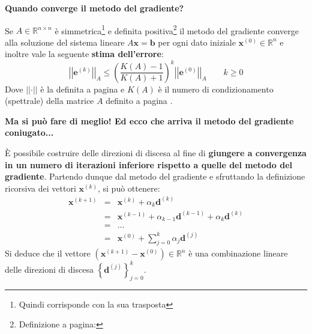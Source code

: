 \newpage

\begin{flushleft}
    \textcolor{Green3}{ \textbf{Quando converge il metodo del gradiente?}}
\end{flushleft}
Se $A \in \mathbb{R}^{n \times n}$ è simmetrica\footnote{Quindi corrisponde con la sua trasposta} e definita positiva\footnote{Definizione a pagina: \pageref{matrice definita positiva}} il metodo del gradiente converge alla soluzione del sistema lineare $A\mathbf{x} = \mathbf{b}$ per ogni dato iniziale $\mathbf{x}^{\left(0\right)} \in \mathbb{R}^{n}$ e inoltre vale la seguente \textbf{stima dell'errore}:
\begin{equation}
    \left|\left| \mathbf{e}^{\left(k\right)} \right|\right|_{A} \le \left(\dfrac{K\left(A\right)-1}{K\left(A\right)+1}\right)^{k} \left|\left| \mathbf{e}^{\left(0\right)} \right|\right|_{A} \hspace{2em} k \ge 0
\end{equation}
Dove $\left|\left| \cdot \right|\right|$ è la  definita a pagina \pageref{eq: norma dell'energia} e $K\left(A\right)$ è il numero di condizionamento (spettrale) della matrice $A$ definito a pagina \pageref{eq: numero di condizionamento (spettrale)}.

\highspace
\begin{flushleft}
    \textcolor{Red2}{ \textbf{Ma si può fare di meglio! Ed ecco che arriva il metodo del gradiente coniugato...}}
\end{flushleft}
È possibile costruire delle direzioni di discesa  al fine di \textbf{giungere a convergenza in un numero di iterazioni inferiore rispetto a quelle del metodo del gradiente}. Partendo dunque dal metodo del gradiente e sfruttando la definizione ricorsiva dei vettori $\mathbf{x}^{\left(k\right)}$, si può ottenere:
\begin{equation}\label{eq: metodo del gradiente migliorato}
    \begin{array}{rcl}
        \mathbf{x}^{\left(k+1\right)} &=& \mathbf{x}^{\left(k\right)} + \alpha_{k}\mathbf{d}^{\left(k\right)} \\ [.5em]
        &=& \mathbf{x}^{\left(k-1\right)} + \alpha_{k-1} \mathbf{d}^{\left(k-1\right)} + \alpha_{k}\mathbf{d}^{\left(k\right)} \\ [.5em]
        &=& \dots \\ [.5em]
        &=& \mathbf{x}^{\left(0\right)} + \displaystyle\sum_{j=0}^{k} \alpha_{j}\mathbf{d}^{\left(j\right)}
    \end{array}
\end{equation}
Si deduce che il vettore $\left(\mathbf{x}^{\left(k+1\right)} - \mathbf{x}^{\left(0\right)}\right) \in \mathbb{R}^{n}$ è una combinazione lineare delle direzioni di discesa $\left\{\mathbf{d}^{\left(j\right)}\right\}_{j=0}^{k}$.

